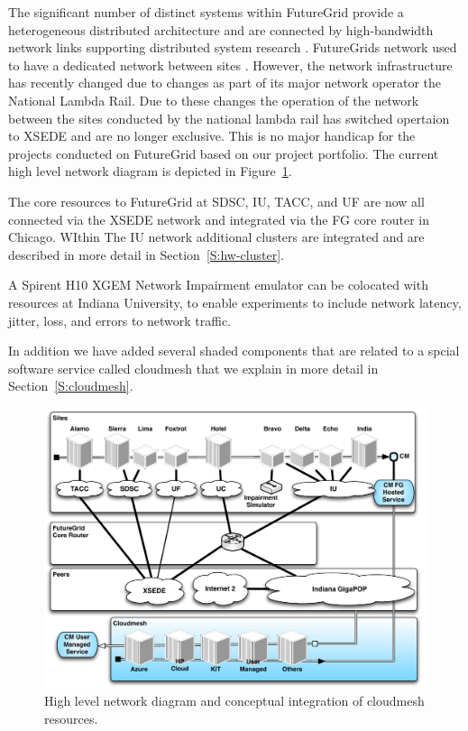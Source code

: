\documentclass{article}
\begin{document}
The significant number of distinct systems within FutureGrid provide a
heterogeneous distributed architecture and are connected by
high-bandwidth network links supporting distributed system research
\cite{las12fg-bookchapter}. FutureGrids network used to have a
dedicated network between sites \cite{las12fg-bookchapter}. However,
the network infrastructure has recently changed due to changes as part
of its major network operator the National Lambda Rail.  Due to these
changes the operation of the network between the sites conducted by
the national lambda rail has switched opertaion to XSEDE and are no
longer exclusive. This is no major handicap for the projects conducted
on FutureGrid based on our project portfolio.  The current high level
network diagram is depicted in Figure~\ref{F:network}.

The core resources to FutureGrid at SDSC, IU, TACC, and UF are now all
connected via the XSEDE network and integrated via the FG core router
in Chicago. WIthin The IU network additional clusters are integrated
and are described in more detail in Section~\ref{S:hw-cluster}. 

A Spirent H10 XGEM Network Impairment emulator
\cite{www-network-impairment} can be colocated with resources at
Indiana University, to enable experiments to include network latency,
jitter, loss, and errors to network traffic.

In addition we have added several shaded components that are related
to a spcial software service called cloudmesh that we explain in more
detail in Section~\ref{S:cloudmesh}.


\begin{figure}[htb]
  \centering
    \includegraphics[width=1.0\textwidth]{images/fg-network-2014-cm.pdf}
  \caption{High level network diagram and conceptual integration of cloudmesh resources.}
\label{F:network}
\end{figure}
\end{document}
